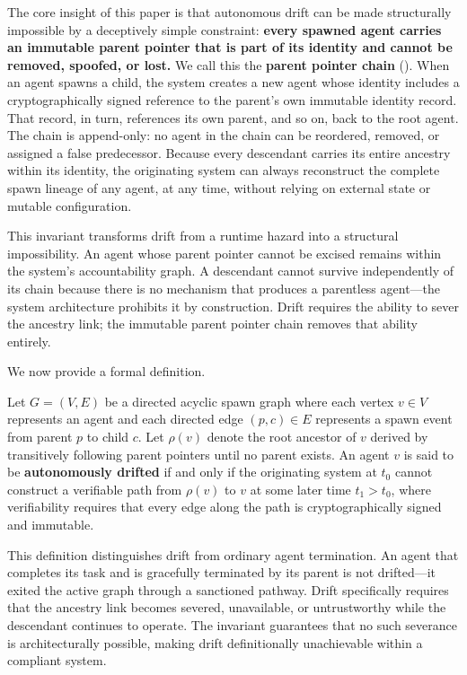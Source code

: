 The core insight of this paper is that autonomous drift can be made structurally impossible by a deceptively simple constraint: \textbf{every spawned agent carries an immutable parent pointer that is part of its identity and cannot be removed, spoofed, or lost.} We call this the \textbf{parent pointer chain} (\PPC). When an agent spawns a child, the system creates a new agent whose identity includes a cryptographically signed reference to the parent's own immutable identity record. That record, in turn, references its own parent, and so on, back to the root agent. The chain is append-only: no agent in the chain can be reordered, removed, or assigned a false predecessor. Because every descendant carries its entire ancestry within its identity, the originating system can always reconstruct the complete spawn lineage of any agent, at any time, without relying on external state or mutable configuration.

This invariant transforms drift from a runtime hazard into a structural impossibility. An agent whose parent pointer cannot be excised remains within the system's accountability graph. A descendant cannot survive independently of its chain because there is no mechanism that produces a parentless agent—the system architecture prohibits it by construction. Drift requires the ability to sever the ancestry link; the immutable parent pointer chain removes that ability entirely.

We now provide a formal definition.

\begin{definition}
Let $G = (V, E)$ be a directed acyclic spawn graph where each vertex $v \in V$ represents an agent and each directed edge $(p, c) \in E$ represents a spawn event from parent $p$ to child $c$. Let $\rho(v)$ denote the root ancestor of $v$ derived by transitively following parent pointers until no parent exists. An agent $v$ is said to be \textbf{autonomously drifted} if and only if the originating system at $t_0$ cannot construct a verifiable path from $\rho(v)$ to $v$ at some later time $t_1 > t_0$, where verifiability requires that every edge along the path is cryptographically signed and immutable.
\end{definition}

This definition distinguishes drift from ordinary agent termination. An agent that completes its task and is gracefully terminated by its parent is not drifted—it exited the active graph through a sanctioned pathway. Drift specifically requires that the ancestry link becomes severed, unavailable, or untrustworthy while the descendant continues to operate. The \PPC invariant guarantees that no such severance is architecturally possible, making drift definitionally unachievable within a compliant system.

